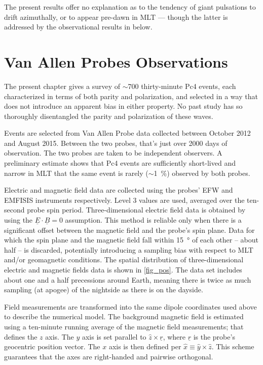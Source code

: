 \documentclass{article}
\newcommand{\about}{\ensuremath{\sim}}
\newcommand{\x}{\ensuremath{x}\xspace}
\newcommand{\y}{\ensuremath{y}\xspace}
\newcommand{\z}{\ensuremath{z}\xspace}
\newcommand{\xhat}{\ensuremath{\hat{x}}\xspace}
\newcommand{\yhat}{\ensuremath{\hat{y}}\xspace}
\newcommand{\zhat}{\ensuremath{\hat{z}}\xspace}
\renewcommand{\vec}[1]{\ensuremath{\underline{#1}}}
\begin{document}
The present results offer no explanation as to the tendency of giant pulsations to drift azimuthally, or to appear pre-dawn in MLT --- though the latter is addressed by the observational results in below.


\section{Van Allen Probes Observations}

The present chapter gives a survey of \about700 thirty-minute Pc4 events, each characterized in terms of both parity and polarization, and selected in a way that does not introduce an apparent bias in either property. No past study has so thoroughly disentangled the parity and polarization of these waves.

Events are selected from Van Allen Probe data collected between October 2012 and August 2015. Between the two probes, that's just over 2000 days of observation. The two probes are taken to be independent observers. A preliminary estimate shows that Pc4 events are sufficiently short-lived and narrow in MLT that the same event is rarely (\about\SI{1}{\percent}) observed by both probes.

Electric and magnetic field data are collected using the probes' EFW\cite{wygant_2013} and EMFISIS instruments respectively. Level 3 values are used, averaged over the ten-second probe spin period. Three-dimensional electric field data is obtained by using the $\vec{E} \cdot \vec{B} = 0$ assumption. This method is reliable only when there is a significant offset between the magnetic field and the probe's spin plane. Data for which the spin plane and the magnetic field fall within \SI{15}{\degree} of each other -- about half -- is discarded, potentially introducing a sampling bias with respect to MLT and/or geomagnetic conditions. The spatial distribution of three-dimensional electric and magnetic fields data is shown in \cref{fig_pos}. The data set includes about one and a half precessions around Earth, meaning there is twice as much sampling (at apogee) of the nightside as there is on the dayside.

Field measurements are transformed into the same dipole coordinates used above to describe the numerical model. The background magnetic field is estimated using a ten-minute running average of the magnetic field
measurements; that defines the \z axis. The \y axis is set parallel to $\zhat \times \vec{r}$, where \vec{r} is the probe's geocentric position vector. The \x axis is then defined per $\xhat \equiv \yhat \times \zhat$. This scheme guarantees that the axes are right-handed and pairwise orthogonal\cite{liu_2009}.
\end{document}
